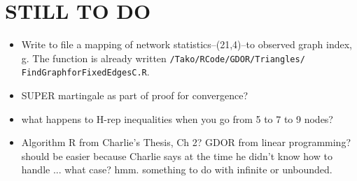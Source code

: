 \documentclass{amsbook}
\theoremstyle{definition}
\theoremstyle{remark}
\begin{document}
\section{STILL TO DO}

\begin{itemize}
\item Write to file a mapping of network statistics--(21,4)--to observed graph index, 
g.  The function is already written \texttt{/Tako/RCode/GDOR/Triangles/
FindGraphforFixedEdgesC.R}.
\item SUPER martingale as part of proof for convergence?
\item what happens to H-rep inequalities when you go from 5 to 7 to 9 nodes?
\item Algorithm R from Charlie's Thesis, Ch 2?  GDOR from linear programming?  should 
be easier because Charlie says at the time he didn't know how to handle ... what case?  
hmm.  something to do with infinite or unbounded.
\end{itemize}





\end{document}
